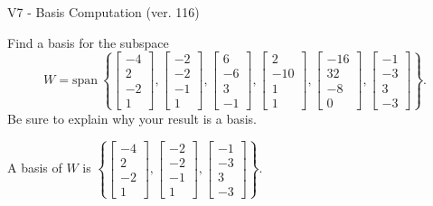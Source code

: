 \begin{exercise}
  \begin{exerciseTitle}V7 - Basis Computation (ver. 116)\end{exerciseTitle}
  \begin{exerciseStatement}
    Find a basis for the subspace 
\[W=\mathrm{span}\ \left\{\left[\begin{array}{r}
-4 \\
2 \\
-2 \\
1
\end{array}\right] , \left[\begin{array}{r}
-2 \\
-2 \\
-1 \\
1
\end{array}\right] , \left[\begin{array}{r}
6 \\
-6 \\
3 \\
-1
\end{array}\right] , \left[\begin{array}{r}
2 \\
-10 \\
1 \\
1
\end{array}\right] , \left[\begin{array}{r}
-16 \\
32 \\
-8 \\
0
\end{array}\right] , \left[\begin{array}{r}
-1 \\
-3 \\
3 \\
-3
\end{array}\right]\right\}.\]
 Be sure to explain why your result is a basis.


  \end{exerciseStatement}
  \begin{exerciseAnswer}
   A basis of \(W\) is  \(\left\{\left[\begin{array}{r}
-4 \\
2 \\
-2 \\
1
\end{array}\right] , \left[\begin{array}{r}
-2 \\
-2 \\
-1 \\
1
\end{array}\right] , \left[\begin{array}{r}
-1 \\
-3 \\
3 \\
-3
\end{array}\right]\right\}\).
  


  \end{exerciseAnswer}
\end{exercise}